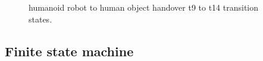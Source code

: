 \documentclass[a4paper, 12pt, oneside]{Thesis}  %
\begin{document}
\begin{figure}[hpt]
	\caption{humanoid robot to human object handover t9 to t14 transition states.}
	\label{fig:r-to-h}
\end{figure}


\subsection{Finite state machine}\label{FSM}
\end{document}
